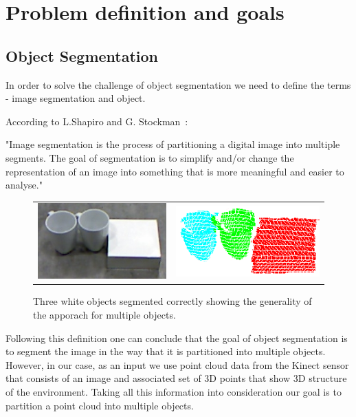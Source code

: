 \section{Problem definition and goals}

\subsection{Object Segmentation} 

In order to solve the challenge of object segmentation we need to define the terms - image segmentation and object. 

According to L.Shapiro and G. Stockman~\cite{shapiro2001computer}:

"Image segmentation is the process of partitioning a digital image into multiple segments. The goal of segmentation is to simplify and/or change the representation of an image into something that is more meaningful and easier to analyse."

\begin{figure}[ht]
\begin{tabular}{cccc}

\multicolumn{2}{c}{\includegraphics[width=0.45\columnwidth]{figures/3objects/after_push.jpg}}
& \multicolumn{2}{c}{\includegraphics[width=0.45\columnwidth]{figures/3objects/segmented.png}}

\end{tabular}
\caption{Three white objects segmented correctly showing the generality of the apporach for multiple objects.}
\label{fig:three_objects}
\end{figure}


 Following this definition one can conclude that the goal of object segmentation is to segment the image in the way that it is partitioned into multiple objects. However, in our case, as an input we use point cloud data from the Kinect sensor that consists of an image and associated set of 3D points that show 3D structure of the environment. Taking all this information into consideration our goal is to partition a point cloud into multiple objects.

